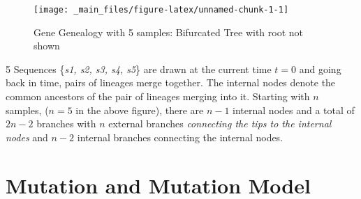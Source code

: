 \documentclass[
]{book}
\theoremstyle{definition}
\theoremstyle{definition}
\theoremstyle{definition}
\theoremstyle{definition}
\theoremstyle{remark}
\begin{document}
\begin{figure}

{\centering \texttt{[image: \_main\_files/figure-latex/unnamed-chunk-1-1]} 

}

\caption{Gene Genealogy with 5 samples: Bifurcated Tree with root not shown}\label{fig:unnamed-chunk-1}
\end{figure}

5 Sequences \{\emph{s1, s2, s3, s4, s5}\} are drawn at the current time \(t=0\) and going back in time, pairs of lineages merge together. The internal nodes denote the common ancestors of the pair of lineages merging into it. Starting with \(n\) samples, (\(n=5\) in the above figure), there are \(n-1\) internal nodes and a total of \(2n-2\) branches with \(n\) external branches \emph{connecting the tips to the internal nodes} and \(n-2\) internal branches connecting the internal nodes.

\hypertarget{mutation-and-mutation-model}{%
\section{Mutation and Mutation Model}\label{mutation-and-mutation-model}}
\end{document}
